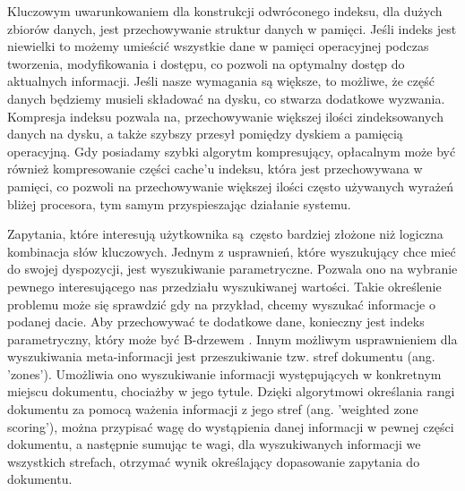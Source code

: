 Kluczowym uwarunkowaniem dla konstrukcji odwróconego indeksu, dla dużych zbiorów
danych, jest przechowywanie struktur danych w pamięci. Jeśli indeks jest niewielki to możemy umieścić
wszystkie dane w pamięci operacyjnej podczas tworzenia, modyfikowania i dostępu, co pozwoli na
optymalny dostęp do aktualnych informacji. Jeśli nasze wymagania są większe, to możliwe, że część danych
będziemy musieli składować na dysku, co stwarza dodatkowe wyzwania. Kompresja indeksu pozwala
na, przechowywanie większej ilości zindeksowanych danych na dysku, a także szybszy przesył pomiędzy
dyskiem a pamięcią operacyjną. Gdy posiadamy szybki algorytm kompresujący, opłacalnym może być
również kompresowanie części cache'u indeksu, która jest przechowywana w pamięci, co pozwoli na przechowywanie większej ilości często używanych wyrażeń bliżej procesora, tym samym przyspieszając działanie systemu.\newline

Zapytania, które interesują użytkownika są często bardziej złożone niż logiczna kombinacja słów kluczowych. Jednym z usprawnień, które wyszukujący chce
mieć do swojej dyspozycji, jest wyszukiwanie parametryczne. Pozwala ono na wybranie pewnego
interesującego nas przedziału wyszukiwanej wartości. Takie określenie problemu może się sprawdzić
gdy na przykład, chcemy wyszukać informacje o podanej dacie. Aby przechowywać te dodatkowe dane,
konieczny jest indeks parametryczny, który może być B-drzewem \autocite{introtoinformationretrieval}. Innym
możliwym usprawnieniem dla wyszukiwania meta-informacji jest przeszukiwanie tzw. stref
dokumentu (ang. 'zones'). Umożliwia ono wyszukiwanie informacji występujących w
konkretnym miejscu dokumentu, chociażby w jego tytule. Dzięki algorytmowi określania rangi dokumentu za
pomocą ważenia informacji z jego stref (ang. 'weighted zone scoring'), można przypisać wagę do
wystąpienia danej informacji w pewnej części dokumentu, a następnie sumując te wagi, dla wyszukiwanych informacji we wszystkich strefach, otrzymać
wynik określający dopasowanie zapytania do dokumentu.\newline

